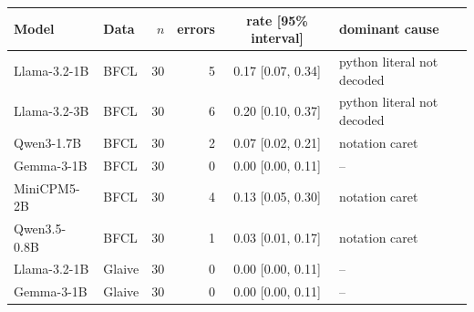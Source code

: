 \begin{tabular}{llrrcl}
\toprule
Model & Data & $n$ & errors & rate [95\% interval] & dominant cause \\
\midrule
Llama-3.2-1B & BFCL & 30 & 5 & 0.17 [0.07, 0.34] & python literal not decoded \\
Llama-3.2-3B & BFCL & 30 & 6 & 0.20 [0.10, 0.37] & python literal not decoded \\
Qwen3-1.7B & BFCL & 30 & 2 & 0.07 [0.02, 0.21] & notation caret \\
Gemma-3-1B & BFCL & 30 & 0 & 0.00 [0.00, 0.11] & -- \\
MiniCPM5-2B & BFCL & 30 & 4 & 0.13 [0.05, 0.30] & notation caret \\
Qwen3.5-0.8B & BFCL & 30 & 1 & 0.03 [0.01, 0.17] & notation caret \\
Llama-3.2-1B & Glaive & 30 & 0 & 0.00 [0.00, 0.11] & -- \\
Gemma-3-1B & Glaive & 30 & 0 & 0.00 [0.00, 0.11] & -- \\
\bottomrule
\end{tabular}

